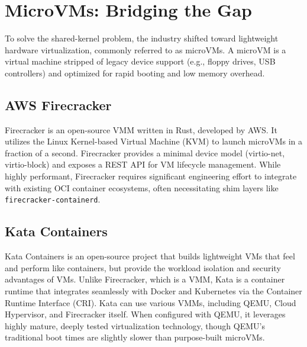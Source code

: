 \documentclass[12pt,a4paper]{report}
\begin{document}
\section{MicroVMs: Bridging the Gap}
To solve the shared-kernel problem, the industry shifted toward lightweight hardware virtualization, commonly referred to as microVMs. A microVM is a virtual machine stripped of legacy device support (e.g., floppy drives, USB controllers) and optimized for rapid booting and low memory overhead.

\subsection{AWS Firecracker}
Firecracker is an open-source VMM written in Rust, developed by AWS. It utilizes the Linux Kernel-based Virtual Machine (KVM) to launch microVMs in a fraction of a second. Firecracker provides a minimal device model (virtio-net, virtio-block) and exposes a REST API for VM lifecycle management. While highly performant, Firecracker requires significant engineering effort to integrate with existing OCI container ecosystems, often necessitating shim layers like \texttt{firecracker-containerd}.

\subsection{Kata Containers}
Kata Containers is an open-source project that builds lightweight VMs that feel and perform like containers, but provide the workload isolation and security advantages of VMs. Unlike Firecracker, which is a VMM, Kata is a container runtime that integrates seamlessly with Docker and Kubernetes via the Container Runtime Interface (CRI).
Kata can use various VMMs, including QEMU, Cloud Hypervisor, and Firecracker itself. When configured with QEMU, it leverages highly mature, deeply tested virtualization technology, though QEMU's traditional boot times are slightly slower than purpose-built microVMs.
\end{document}
